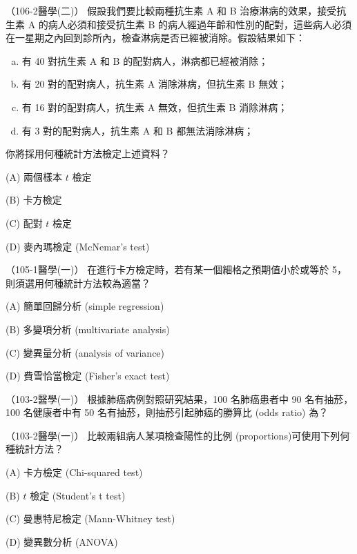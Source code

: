     \begin{docexam}{（106-2醫學(二)）}
        假設我們要比較兩種抗生素 A 和 B 治療淋病的效果，接受抗生素 A 的病人必須和接受抗生素 B 的病人經過年齡和性別的配對，這些病人必須在一星期之內回到診所內，檢查淋病是否已經被消除。假設結果如下：

        \begin{enumerate}[(a)]
            \item 有 40 對抗生素 A 和 B 的配對病人，淋病都已經被消除；
            \item 有 20 對的配對病人，抗生素 A 消除淋病，但抗生素 B 無效；
            \item 有 16 對的配對病人，抗生素 A 無效，但抗生素 B 消除淋病；
            \item 有 3 對的配對病人，抗生素 A 和 B 都無法消除淋病；
        \end{enumerate}

        你將採用何種統計方法檢定上述資料？

        (A) 兩個樣本 $t$ 檢定
        
        (B) 卡方檢定

        (C) 配對 $t$ 檢定
 
        (D) 麥內瑪檢定 (McNemar's test)
    \end{docexam}
    
    \begin{docexam}{（105-1醫學(一)）}
        在進行卡方檢定時，若有某一個細格之預期值小於或等於 5，則須選用何種統計方法較為適當？

        (A) 簡單回歸分析 (simple regression)
        
        (B) 多變項分析 (multivariate analysis)

        (C) 變異量分析 (analysis of variance)
 
        (D) 費雪恰當檢定 (Fisher's exact test)
    \end{docexam}
    
    \begin{docexam}{（103-2醫學(一)）}
        根據肺癌病例對照研究結果，100 名肺癌患者中 90 名有抽菸，100 名健康者中有 50 名有抽菸，則抽菸引起肺癌的勝算比 (odds ratio) 為？
    \end{docexam}
    
    \begin{docexam}{（103-2醫學(一)）}
        比較兩組病人某項檢查陽性的比例 (proportions)可使用下列何種統計方法？
        
        (A) 卡方檢定 (Chi-squared test)
        
        (B) $t$ 檢定 (Student's t test)

        (C) 曼惠特尼檢定 (Mann-Whitney test)
 
        (D) 變異數分析 (ANOVA)
    \end{docexam}
    
